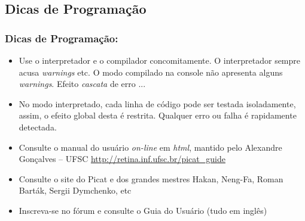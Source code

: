 \subsection{Dicas de Programação}
\begin{frame}[fragile] 

    \frametitle{Dicas de Programação:}

    \begin{itemize}
      \item Use o interpretador e o compilador concomitamente. O interpretador
      sempre acusa \textit{warnings} etc. O modo compilado na console não apresenta
      alguns \textit{warnings}. Efeito \textit{cascata} de erro ...

      \pause
      \item No modo interpretado, cada linha de código pode ser testada isoladamente,
      assim, o efeito global desta é restrita. Qualquer erro ou falha é rapidamente
      detectada.

       \pause
      \item Consulte o manual do usuário \textit{on-line} em \textit{html}, 
      mantido pelo Alexandre Gonçalves -- UFSC
      \url{http://retina.inf.ufsc.br/picat_guide}


      \pause
      \item Consulte o site do Picat e dos grandes mestres Hakan, Neng-Fa, Roman Barták, 
      Sergii Dymchenko, etc

      \pause
      \item Inscreva-se no fórum e consulte o Guia do Usuário (tudo em inglês)


    \end{itemize}
\end{frame}



